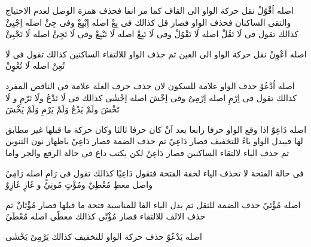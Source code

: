 \begin{twocol}
\begin{rightcol}
اصله اُقْوُلْ نقل حركة الواو الى القاف كما مر انفا فحذف همزة الوصل لعدم الاحتياج والتقى الساكنان فحذف الواو فصار قل كذالك فى بِعْ اصله اِبْيِعْ وفى جِئْ اصله اِجْيِئْ كذالك تقول فى لَا تَقُلْ اصله لَا تَقْوُلْ وفى لَا تَبِعْ اصله لَا تَبْيِعْ وفى لَا تَجِئْ اصله لَا تَجْيِئْ
\par
{}
اصله اَعْوِنْ نقل حركة الواو الى العين ثم حذف الواو للالتقاء الساكنين كذالك تقول فى لَا تُعِنْ اصله لَا تُعْوِنْ
\par
{}
اصله اُدْعُوْ حذف الواو علامة للسكون لان حذف حرف العلة علامة فى الناقص المفرد كذالك تقول فى اِرْمِ اصله اِرْمِىْ وفى اِخْشَ اصله اِخْشٰى كذالك فى لَا تَدْعُ ولَا تَرْمِ و لَا تَخْشَ ولَمْ يَدْعُ وَلَمْ يَرْمِ وَلَمْ يَخْشَ
\par
{} %
اصله دَاعِوٌ اذا وقع الواو حرفا رابعا بعد اَنْ كان حرفا ثالثا وكان حركة ما قبلها غير مطابق لها فيبدل الواو ياءً للتخفيف فصار دَاعِيٌ ثم حذف الضمة فصار دَاعِيْ باظهار نون التنوين ثم حذف الياء لالتقاء الساكنين فصار دَاعِنْ لكن يكتب داع فى حالة الرفع والجر واما
\end{rightcol}
\begin{leftcol}
فى حالة الفتحة لا تحذف الياء لخفة الفتحة فتقول دَاعِيًا كذالك تقول فى رَامٍ اصله رَامِيٌ واصل معطٍ مُعْطِيٌ ومُؤْتٍ مُوتِيٌ و غَازٍ غَازِوٌ
\par
{}
اصله مُؤْتَيٌ حذف الضمة للثقل ثم بدل الياء الفا للمناسبة فتحة ما قبلها فصار مُؤْتَانْ ثم حذف الالف للالتقاء فصار مُؤْتًى كذالك معطًى اصله مُعْطَيٌ
\par
{}
اصله يَدْعُوُ حذف حركة الواو للتخفيف كذالك يَرْمِىْ يَخْشٰى
\par

\end{leftcol}
\end{twocol}
